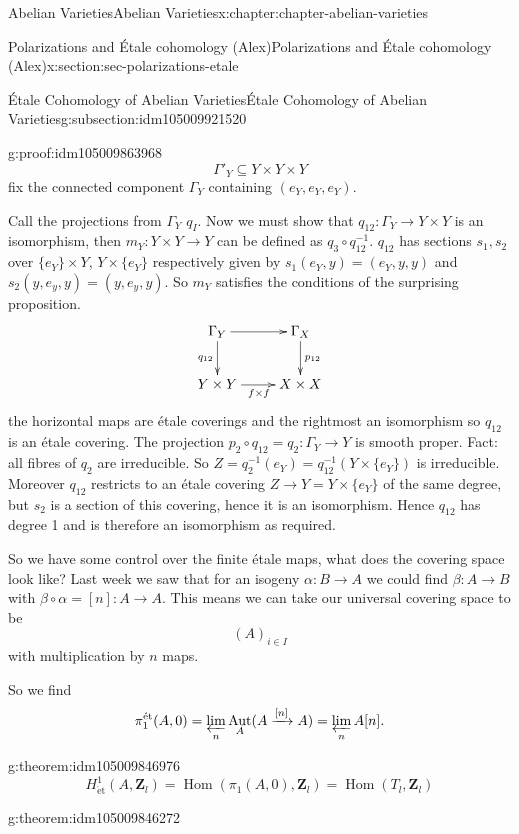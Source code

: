 \documentclass[oneside,10pt,]{book}
\numberwithin{equation}{section}
\newcommand{\lb}{[}
\newcommand{\rb}{]}
\newcommand{\ZZ}{\mathbf{Z}}
\newcommand{\et}{\mathrm{\acute{e}t}}
\DeclareMathOperator{\Hom}{Hom}
\DeclareMathOperator{\Aut}{Aut}
\begin{document}
\begin{chapterptx}{Abelian Varieties}{}{Abelian Varieties}{}{}{x:chapter:chapter-abelian-varieties}
\begin{sectionptx}{Polarizations and Étale cohomology (Alex)}{}{Polarizations and Étale cohomology (Alex)}{}{}{x:section:sec-polarizations-etale}
\begin{subsectionptx}{Étale Cohomology of Abelian Varieties}{}{Étale Cohomology of Abelian Varieties}{}{}{g:subsection:idm105009921520}
\begin{proofptx}{}{g:proof:idm105009863968}
\begin{equation*}
\Gamma'_Y \subseteq Y\times Y\times Y
\end{equation*}
fix the connected component \(\Gamma_Y\) containing \((e_Y,e_Y,e_Y)\).%
\par
Call the projections from \(\Gamma_Y\) \(q_I\). Now we must show that \(q_{12}\colon \Gamma_Y \to Y\times Y\) is an isomorphism, then \(m_Y\colon Y\times Y \to Y\) can be defined as \(q_3 \circ q_{12}^{-1}\). \(q_{12}\) has sections \(s_1,s_2\) over \(\{e_Y\}\times Y\), \(Y\times \{e_Y\}\) respectively given by \(s_1(e_Y,y) = (e_Y,y,y)\) and \(s_2(y,e_y,y) = (y,e_y,y)\). So \(m_Y\) satisfies the conditions of the surprising proposition.%
\begin{equation*}
\xymatrix{
\Gamma_Y \ar[r]\ar[d]_{q_{12}} & \Gamma_X\ar[d]^{p_{12}} \\
Y\times Y \ar[r]_{f\times f} & X\times X
}
\end{equation*}
the horizontal maps are étale coverings and the rightmost an isomorphism so \(q_{12}\) is an étale covering. The projection \(p_2 \circ q_{12} = q_2 \colon \Gamma_Y\to Y\) is smooth proper. Fact: all fibres of \(q_2\) are irreducible. So \(Z = q_2^{-1} (e_Y) = q_{12}^{-1}(Y\times \{e_Y\})\) is irreducible. Moreover \(q_{12}\) restricts to an étale covering \(Z \to Y = Y\times\{e_Y\}\) of  the same degree, but \(s_2\) is a section of this covering, hence it is an isomorphism. Hence \(q_{12}\) has degree 1 and is therefore an isomorphism as required.%
\end{proofptx}
So we have some control over the finite étale maps, what does the covering space look like? Last week we saw that for an isogeny \(\alpha\colon B \to A\) we could find \(\beta \colon A \to B\) with \(\beta\circ\alpha = \lb n\rb\colon A \to A\). This means we can take our universal covering space to be%
\begin{equation*}
(A)_{i\in I}
\end{equation*}
with multiplication by \(n\) maps.%
\par
So we find%
\begin{equation*}
\pi_1^\et(A,0) =\varprojlim_n \Aut_A(A\xrightarrow{[n]} A)=  \varprojlim_n A[n]\text{.}
\end{equation*}
%
\begin{theorem}{}{}{g:theorem:idm105009846976}%
%
\begin{equation*}
H^1_\et(A , \ZZ_l) = \Hom(\pi_1(A,0), \ZZ_l) = \Hom(T_l,\ZZ_l)
\end{equation*}
%
\end{theorem}
\begin{theorem}{}{}{g:theorem:idm105009846272}%

\end{theorem}
\end{subsectionptx}
\end{sectionptx}
\end{chapterptx}
\end{document}
